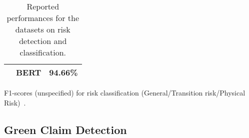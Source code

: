 \begin{table*}[ht]
\begin{subtable}[t]{0.35\textwidth}
{\begin{tabular}{llc}
        \citet{kolbel_ask_2021} & BERT & 94.66\% \\
        \bottomrule
        \end{tabular}
        }
        \caption{F1-scores (unspecified) for risk classification (General/Transition risk/Physical Risk)~\cite{kolbel_ask_2021}.}
        \label{tab:f1_scores_cn_tp}
    \end{subtable}
    
    \caption{Reported performances for the datasets on risk detection and classification.}
    \label{tab:reported perf risk}
\end{table*}  

\newpage

\subsection{Green Claim Detection}

